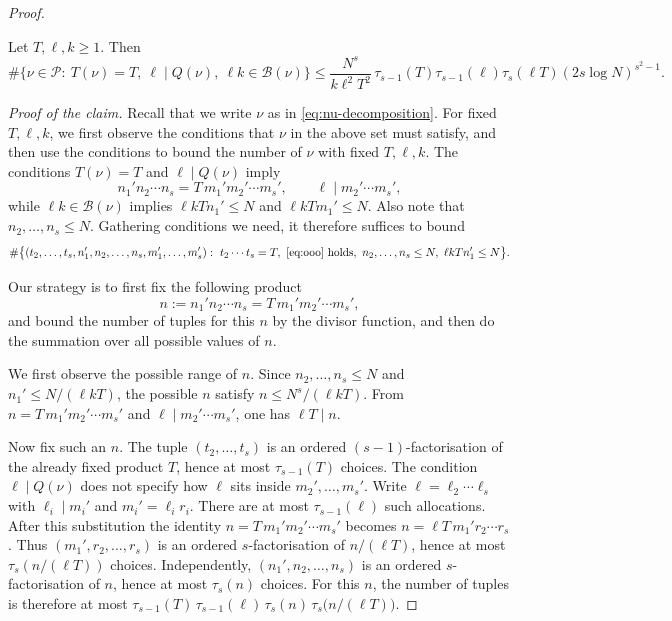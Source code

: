 \begin{proof}
\begin{clm}
Let $T,\ell,k\geq 1$.  Then
\begin{equation}\label{eq:pieces-divisor-majorant}
\#\bigl\{\nu\in\mathscr P:\ T(\nu)=T,\ \ell\mid Q(\nu),\ \ell k\in\mathscr B(\nu)\bigr\}
\leq
\frac{N^s}{k\ell^2T^2}\,
\tau_{s-1}(T)\tau_{s-1}(\ell)\tau_s(\ell T)(2s\log N)^{s^2-1}.
\end{equation}
\end{clm}

\noindent\textit{Proof of the claim.}
Recall that we write $\nu$ as in \eqref{eq:nu-decomposition}.
For fixed $T,\ell,k$,
we first observe the conditions that $\nu$ in the above set must satisfy, and then use the conditions to bound the number of $\nu$ with fixed $T,\ell,k$.
The conditions $T(\nu)=T$ and $\ell\mid Q(\nu)$ imply
\begin{equation}\label{eq:ooo}
n_1'n_2\cdots n_s
=T\,m_1'm_2'\cdots m_s',\qquad
\ell\mid m_2'\cdots m_s',
\end{equation}
while $\ell k\in\mathscr B(\nu)$ implies
$\ell kTn_1'\leq N$ and $\ell kTm_1'\leq N$.
Also note that $n_2,\ldots,n_s\leq N$. 
Gathering conditions we need, it therefore suffices to bound
\[
\#\bigl\{
(t_2,\ldots,t_s,n_1',n_2,\ldots,n_s,m_1',\ldots,m_s')
:\ 
t_2\cdots t_s=T,\ 
\text{\eqref{eq:ooo} holds},\ 
n_2,\ldots,n_s\leq N,\ 
\ell kTn_1'\leq N
\bigr\}.
\]

Our strategy is to first fix the following product
\[
n:=n_1'n_2\cdots n_s=T\,m_1'm_2'\cdots m_s',
\]
and bound the number of tuples for this $n$ by the divisor function, and then do the summation over all possible values of $n$.

We first observe the possible range of $n$.
Since \(n_2,\ldots,n_s\leq N\) and \(n_1'\leq N/(\ell kT)\), the possible $n$ satisfy \(n\leq N^s/(\ell kT)\).
From \(n=T\,m_1'm_2'\cdots m_s'\) and \(\ell\mid m_2'\cdots m_s'\), one has \(\ell T\mid n\).

Now fix such an $n$.
The tuple $(t_2,\ldots,t_s)$ is an ordered $(s-1)$-factorisation of the already fixed product $T$, hence at most $\tau_{s-1}(T)$ choices.
The condition $\ell\mid Q(\nu)$ does not specify how $\ell$ sits inside $m_2',\ldots,m_s'$.
Write $\ell=\ell_2\cdots\ell_s$ with $\ell_i\mid m_i'$ and $m_i'=\ell_i r_i$.
There are at most $\tau_{s-1}(\ell)$ such allocations.
After this substitution the identity $n=T\,m_1'm_2'\cdots m_s'$ becomes $n=\ell T\,m_1'r_2\cdots r_s$.
Thus $(m_1',r_2,\ldots,r_s)$ is an ordered $s$-factorisation of $n/(\ell T)$, hence at most $\tau_s(n/(\ell T))$ choices.
Independently, $(n_1',n_2,\ldots,n_s)$ is an ordered $s$-factorisation of $n$, hence at most $\tau_s(n)$ choices.
For this $n$, the number of tuples is therefore at most
$\tau_{s-1}(T)\,\tau_{s-1}(\ell)\,\tau_s(n)\,\tau_s\bigl(n/(\ell T)\bigr)$.


\end{proof}
